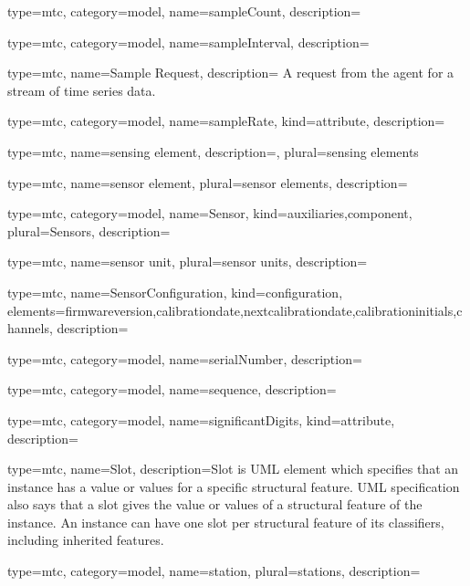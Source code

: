 {
  type=mtc,
  category=model,
  name={sampleCount},
  description={}
}


{
  type=mtc,
  category=model,
  name={sampleInterval},
  description={}
}


{
  type=mtc,
  name={Sample Request},
  description= {A request from the \gls{agent} for a stream of time series data.}
}


{
  type=mtc,
  category=model,
  name={sampleRate},
  kind={attribute},
  description={}
}


{
  type=mtc,
  name={sensing element},
  description={},
  plural={sensing elements}
}


{
  type=mtc,
  name={sensor element},
  plural={sensor elements},
  description={}
}


{
  type=mtc,
  category=model,
  name={Sensor},
  kind={auxiliaries,component},
  plural={Sensors},
  description= {}
}


{
  type=mtc,
  name={sensor unit},
  plural={sensor units},
  description= {}
}


{
  type=mtc,
  name={SensorConfiguration},
  kind={configuration},
  elements={\gls{firmwareversion},\gls{calibrationdate},\gls{nextcalibrationdate},\gls{calibrationinitials},\gls{channels}},
  description= {}
}


{
  type=mtc,
  category=model,
  name={serialNumber},
  description={}
}


{
  type=mtc,
  category=model,
  name={sequence},
  description={}
}


{
  type=mtc,
  category=model,
  name={significantDigits},
  kind={attribute},
  description={}
}


{
  type=mtc,
  name=Slot,
  description={Slot is UML element which specifies that an instance has a value or values for a specific structural feature. UML specification also says that a slot gives the value or values of a structural feature of the instance. An instance can have one slot per structural feature of its classifiers, including inherited features.}
}


{
  type=mtc,
  category=model,
  name={station},
  plural={stations},
  description={}
}


